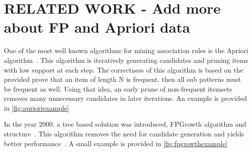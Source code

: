 \section{RELATED WORK - Add more about FP and Apriori data}



  One of the most well known algorithms for mining association rules is the Apriori algorithm~\cite{agrawal1994fast}. This algorithm is iteratively generating candidates and pruning items with low support at each step. The correctness of this algorithm is based on the provided prove that an item of length N is frequent, then all sub patterns must be frequent as well. Using that idea, an early prune of non-frequent itemsets removes many unnecessary candidates in later iterations. An example is provided in \autoref{fig:aprioriexample}
  
In the year 2000, a tree based solution was introduced, FPGrowth algorithm and structure~\cite{agrawal1994fast}. This algorithm removes the need for candidate generation and yields better performance~\cite{hunyadi2011performance}. A small example is provided in \autoref{fig:fpgrowthexample}

